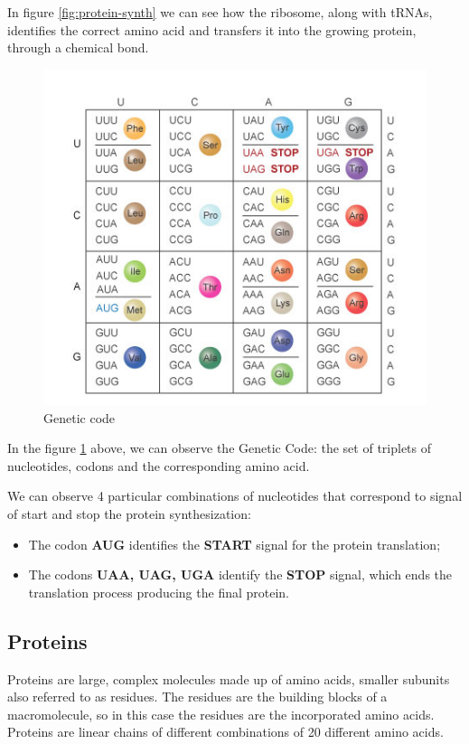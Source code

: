 In figure \ref{fig:protein-synth} we can see how the ribosome, along with tRNAs, identifies the correct amino acid and transfers it into the growing protein, through a chemical bond.

\begin{figure}[h!]
	\includegraphics[scale=1.4]{res/proteins_overview/genetic_code.png}
	\centering
	\caption{Genetic code}
	\label{fig:genetic-code}
\end{figure}

In the figure \ref{fig:genetic-code} above, we can observe the Genetic Code: the set of triplets of nucleotides, codons and the corresponding amino acid.

We can observe 4 particular combinations of nucleotides that correspond to signal of start and stop the protein synthesization:
\begin{itemize}
	\item The codon \textbf{AUG} identifies the \textbf{START} signal for the protein translation;
	\item The codons \textbf{UAA, UAG, UGA} identify the \textbf{STOP} signal, which ends the translation process producing the final protein.
\end{itemize}
\vspace{5em}
\subsection{Proteins}
Proteins are large, complex molecules made up of amino acids, smaller subunits also referred to as residues. The residues are the building blocks of a macromolecule, so in this case the residues are the incorporated amino acids.
Proteins are linear chains of different combinations of 20 different amino acids. 

